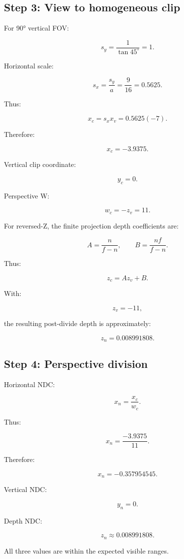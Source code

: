\subsection{Step 3: View to homogeneous clip}\label{02-foundations-ii-ch037-step-3-view-to-homogeneous-clip}

For 90° vertical FOV:

\[ s_y=\frac1{\tan45^\circ}=1. \]

Horizontal scale:

\[ s_x=\frac{s_y}{a}=\frac9{16}=0.5625. \]

Thus:

\[ x_c=s_xx_v=0.5625(-7). \]

Therefore:

\[ \boxed{x_c=-3.9375}. \]

Vertical clip coordinate:

\[ \boxed{y_c=0}. \]

Perspective W:

\[ \boxed{w_c=-z_v=11}. \]

For reversed-Z, the finite projection depth coefficients are:

\[ A=\frac n{f-n}, \qquad B=\frac{nf}{f-n}. \]

Thus:

\[ z_c=Az_v+B. \]

With:

\[ z_v=-11, \]

the resulting post-divide depth is approximately:

\[ \boxed{z_n=0.008991808}. \]

\subsection{Step 4: Perspective division}\label{02-foundations-ii-ch037-step-4-perspective-division}

Horizontal NDC:

\[ x_n=\frac{x_c}{w_c}. \]

Thus:

\[ x_n=\frac{-3.9375}{11}. \]

Therefore:

\[ \boxed{ x_n=-0.357954545. } \]

Vertical NDC:

\[ \boxed{y_n=0}. \]

Depth NDC:

\[ \boxed{z_n\approx0.008991808}. \]

All three values are within the expected visible ranges.

